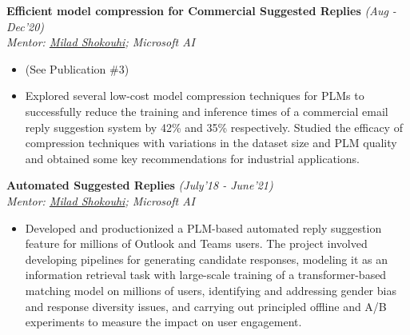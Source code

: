 \textsf{\textbf{Efficient model compression for Commercial Suggested Replies}} \hfill\textit{\small(Aug - Dec'20)}
\\ {\textit{Mentor: \href{https://www.microsoft.com/en-us/research/people/milads/}{Milad Shokouhi}; Microsoft AI}}
\normalsize
\begin{itemize}[leftmargin=*]\compresslist
\item[] (See Publication \#3)\vspace{-1mm}
\item[] Explored several low-cost model compression techniques for PLMs to successfully reduce the training and inference times of a commercial email reply suggestion system by 42\% and 35\% respectively. Studied the efficacy of compression techniques with variations in the dataset size and PLM quality and obtained some key recommendations for industrial applications.
\end{itemize}

\textsf{\textbf{Automated Suggested Replies}} \hfill\textit{\small(July'18 - June'21)}
\\ {\textit{Mentor: \href{https://www.microsoft.com/en-us/research/people/milads/}{Milad Shokouhi}; Microsoft AI}} \hfill{ }
\normalsize
\begin{itemize}[leftmargin=*]\compresslist
\item[] Developed and productionized a PLM-based automated reply suggestion feature for millions of Outlook and Teams users. The project involved developing pipelines for generating candidate responses, modeling it as an information retrieval task with large-scale training of a transformer-based matching model on millions of users, identifying and addressing gender bias and response diversity issues, and carrying out principled offline and A/B experiments to measure the impact on user engagement.
\end{itemize}